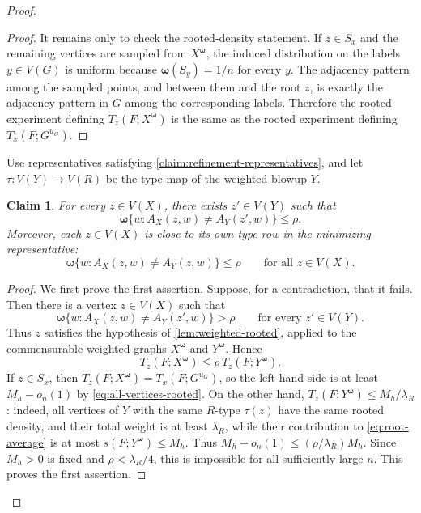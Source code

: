 \documentclass[10pt]{article}
\theoremstyle{plain}
\newtheorem{claim}[claim]{Claim}
\theoremstyle{remark}
\newcommand{\bomega}{{\boldsymbol{\omega}}}
\begin{document}
\begin{proof}
\begin{proof}
It remains only to check the rooted-density statement. If $z\in S_x$ and the remaining vertices are sampled from $X^\bomega$, the induced distribution on the labels $y\in V(G)$ is uniform because $\bomega(S_y)=1/n$ for every $y$. The adjacency pattern among the sampled points, and between them and the root $z$, is exactly the adjacency pattern in $G$ among the corresponding labels. Therefore the rooted experiment defining $T_z(F;X^\bomega)$ is the same as the rooted experiment defining $T_x(F;G^{u_G})$.
\end{proof}

Use representatives satisfying \cref{claim:refinement-representatives}, and let $\tau:V(Y)\to V(R)$ be the type map of the weighted blowup $Y$.

\begin{claim}
\label{claim:row-close-to-quotient-row}
For every $z\in V(X)$, there exists $z'\in V(Y)$ such that
\[
        \bomega\{w:A_X(z,w)\ne A_Y(z',w)\}\le\rho.
\]
Moreover, each $z\in V(X)$ is close to its own type row in the minimizing representative:
\begin{equation}
\label{eq:own-row-close}
        \bomega\{w:A_X(z,w)\ne A_Y(z,w)\}\le\rho
        \qquad\text{for all }z\in V(X).
\end{equation}
\end{claim}

\begin{proof}
We first prove the first assertion. Suppose, for a contradiction, that it fails. Then there is a vertex $z\in V(X)$ such that
\[
        \bomega\{w:A_X(z,w)\ne A_Y(z',w)\}>\rho
        \qquad\text{for every }z'\in V(Y).
\]
Thus $z$ satisfies the hypothesis of \cref{lem:weighted-rooted}, applied to the commensurable weighted graphs $X^\bomega$ and $Y^\bomega$. Hence
\[
        T_z(F;X^\bomega)\le \rho\,T_z(F;Y^\bomega).
\]
If $z\in S_x$, then $T_z(F;X^\bomega)=T_x(F;G^{u_G})$, so the left-hand side is at least $M_h-o_n(1)$ by
\eqref{eq:all-vertices-rooted}. On the other hand, $T_z(F;Y^\bomega)\le M_h/\lambda_R$: indeed, all vertices of $Y$ with the same $R$-type $\tau(z)$ have the same rooted density, and their total weight is at least $\lambda_R$, while their contribution to \eqref{eq:root-average} is at most $s(F;Y^\bomega)\le M_h$. Thus $M_h-o_n(1)\le(\rho/\lambda_R)M_h$. Since $M_h>0$ is fixed and $\rho<\lambda_R/4$, this is impossible for all sufficiently large $n$. This proves the first assertion.


\end{proof}
\end{proof}
\end{document}
